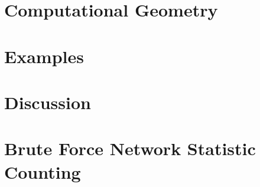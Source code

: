 \documentclass[oneside]{myumnStatThesis}
\begin{document}
\chapter{Computational Geometry} \label{Chapter:Linear programming}
 
%

\chapter{Examples} \label{S:Examples}


\chapter{Discussion}



%

%

\appendix
\chapter{Brute Force Network Statistic Counting} \label{Section:Count Triangles}

\end{document}
